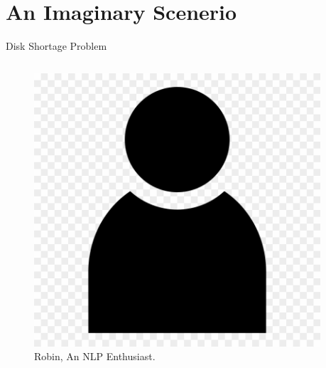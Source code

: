 \section{An Imaginary Scenerio}
\begin{frame}{Disk Shortage Problem}
     \begin{columns}
     \begin{figure}
         \centering
         \includegraphics[width=\textwidth, keepaspectratio]{attachments/vodro/person.png}
         \caption{Robin, An NLP Enthusiast.}
         \label{fig:nlp_man}
     \end{figure}
     \begin{columns}
     \end{columns}

\end{columns}
\end{frame}
